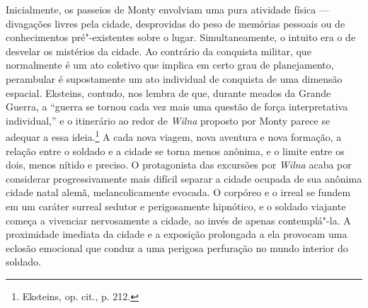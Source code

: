 Inicialmente, os passeios de Monty envolviam uma pura atividade física ---
divagações livres pela cidade, desprovidas do peso de memórias pessoais
ou de conhecimentos pré"-existentes sobre o lugar. Simultaneamente, o
intuito era o de desvelar os mistérios da cidade. Ao contrário da
conquista militar, que normalmente é um ato coletivo que implica em
certo grau de planejamento, perambular é supostamente um ato individual
de conquista de uma dimensão espacial. Eksteins, contudo, nos lembra de
que, durante meados da Grande Guerra, a ``guerra se tornou cada vez mais
uma questão de força interpretativa individual,'' e o itinerário ao
redor de \textit{Wilna} proposto por Monty parece se adequar a essa
ideia.\footnote{Eksteins, op. cit., p. 212.} A cada nova viagem, nova
aventura e nova formação, a relação entre o soldado e a cidade se torna
menos anônima, e o limite entre os dois, menos nítido e preciso. O
protagonista das excursões por \textit{Wilna} acaba por considerar
progressivamente mais difícil separar a cidade ocupada de sua anônima
cidade natal alemã, melancolicamente evocada. O corpóreo e o irreal se
fundem em um caráter surreal sedutor e perigosamente hipnótico, e o
soldado viajante começa a vivenciar nervosamente a cidade, ao invés de
apenas contemplá"-la. A proximidade imediata da cidade e a exposição
prolongada a ela provocam uma eclosão emocional que conduz a uma
perigosa perfuração no mundo interior do soldado.

